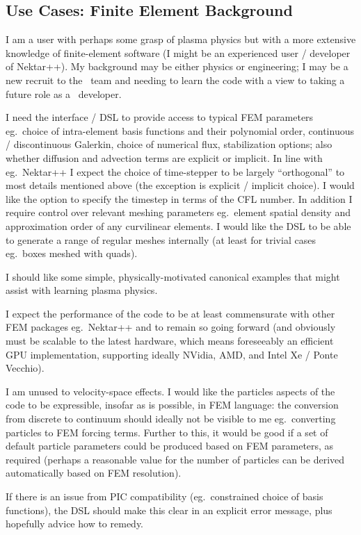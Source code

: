 \subsection{Use Cases: Finite Element Background}\label{sec:use-cases-finite-element-background}

I am a user with perhaps some grasp of plasma physics but with a more extensive 
knowledge of finite-element software (I might be an experienced user / 
developer of Nektar++).  My background may be either physics or engineering; I 
may be a new recruit to the \nep \ team and needing to learn the code with a 
view to taking a future role as a \nep \ developer.

I need the interface / DSL to provide access to typical FEM parameters eg.\ 
choice of intra-element basis functions and their polynomial order, continuous 
/ discontinuous Galerkin, choice of numerical flux, stabilization options; also 
whether diffusion and advection terms are explicit or implicit.  In line with 
eg.\ Nektar++ I expect the choice of time-stepper to be largely ``orthogonal'' 
to most details mentioned above (the exception is explicit / implicit choice).  
I would like the option to specify the timestep in terms of the CFL number.
In addition I require control 
over relevant meshing parameters eg.\ element spatial density and approximation 
order of any curvilinear elements.
I would like the DSL to be able to generate a range of regular meshes 
internally (at least for trivial cases eg.\ boxes meshed with quads).

I should like some simple, physically-motivated canonical examples that might
assist with learning plasma physics.

I expect the performance of the code to be at least commensurate with other FEM 
packages eg.\ Nektar++ and to remain so going forward (and obviously must be 
scalable to the latest hardware, which means foreseeably an efficient GPU 
implementation, supporting ideally NVidia, AMD, and Intel Xe / Ponte Vecchio).

I am unused to velocity-space effects.
I would like the particles aspects of the code to be expressible, insofar as is 
possible, in FEM language: the conversion from discrete to continuum should 
ideally not be visible to me eg.\ converting particles to FEM forcing terms.  
Further to this, it would be good if a set of default particle parameters could 
be produced based on FEM parameters, as required (perhaps a reasonable value 
for the number of particles can be derived automatically based on FEM 
resolution).

If there is an issue from PIC compatibility (eg.\ constrained choice of basis 
functions), the DSL should make this clear in an explicit error message, plus 
hopefully advice how to remedy.


